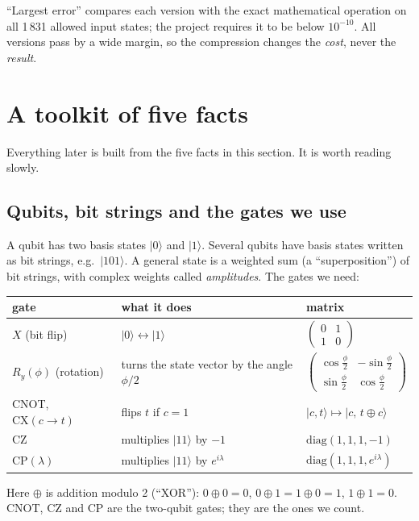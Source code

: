 \documentclass[11pt]{article}
\providecommand{\ket}[1]{|#1\rangle}
\newcommand{\CX}{\mathrm{CX}}
\newcommand{\Ry}{R_y}
\begin{document}
``Largest error'' compares each version with the exact mathematical operation on all 1\,831 allowed input
states; the project requires it to be below $10^{-10}$.  All versions pass by a wide margin, so the
compression changes the \emph{cost}, never the \emph{result}.

\section{A toolkit of five facts}\label{sec:toolkit}

Everything later is built from the five facts in this section.  It is worth reading slowly.

\subsection{Qubits, bit strings and the gates we use}

A qubit has two basis states $\ket0$ and $\ket1$.  Several qubits have basis states written as bit strings,
e.g.\ $\ket{101}$.  A general state is a weighted sum (a ``superposition'') of bit strings, with complex
weights called \emph{amplitudes}.  The gates we need:

\begin{center}
\renewcommand{\arraystretch}{1.25}
\begin{tabular}{l l l}
\toprule
gate & what it does & matrix\\
\midrule
$X$ (bit flip) & $\ket0\leftrightarrow\ket1$ & $\begin{pmatrix}0&1\\1&0\end{pmatrix}$\\
$\Ry(\phi)$ (rotation) & turns the state vector by the angle $\phi/2$ & $\begin{pmatrix}\cos\frac\phi2&-\sin\frac\phi2\\ \sin\frac\phi2&\cos\frac\phi2\end{pmatrix}$\\
CNOT, $\CX(c\to t)$ & flips $t$ if $c=1$ & $\ket{c,t}\mapsto\ket{c,\,t\oplus c}$\\
CZ & multiplies $\ket{11}$ by $-1$ & $\mathrm{diag}(1,1,1,-1)$\\
CP$(\lambda)$ & multiplies $\ket{11}$ by $e^{i\lambda}$ & $\mathrm{diag}(1,1,1,e^{i\lambda})$\\
\bottomrule
\end{tabular}
\end{center}
Here $\oplus$ is addition modulo 2 (``XOR''): $0\oplus0=0$, $0\oplus1=1\oplus0=1$, $1\oplus1=0$.
CNOT, CZ and CP are the two-qubit gates; they are the ones we count.
\end{document}
